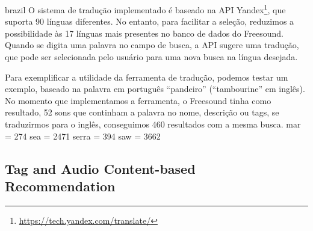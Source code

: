 \begin{otherlanguage*}{brazil}
O sistema de tradução implementado é baseado na API Yandex\footnote{\url{https://tech.yandex.com/translate/}}, que suporta 90 línguas diferentes. No entanto, para facilitar a seleção, reduzimos a possibilidade às 17 línguas mais presentes no banco de dados do Freesound. Quando se digita uma palavra no campo de busca, a API sugere uma tradução, que pode ser selecionada pelo usuário para uma nova busca na língua desejada.

Para exemplificar a utilidade da ferramenta de tradução, podemos testar um exemplo, baseado na palavra em português ``pandeiro'' (``tambourine'' em inglês). No momento que implementamos a ferramenta, o Freesound tinha como resultado, 52 sons que continham a palavra no nome, descrição ou tags, se traduzirmos para o inglês, conseguimos 460 resultados com a mesma busca. mar = 274 sea = 2471
serra = 394
saw = 3662




\subsection{Tag and Audio Content-based Recommendation}


\end{otherlanguage*}
